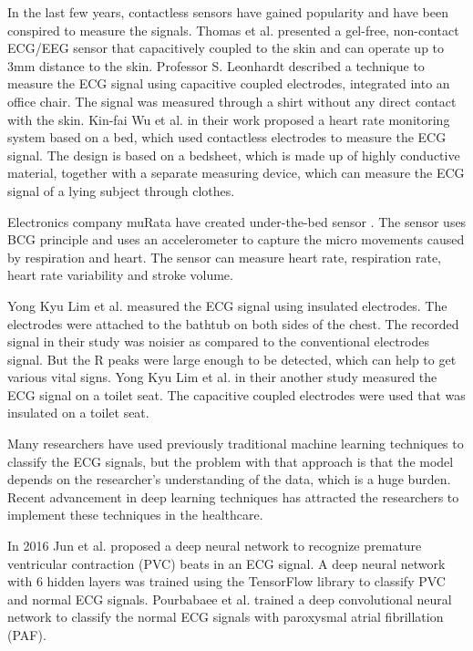 In the last few years, contactless sensors have gained popularity and have been conspired to measure the signals. Thomas et al. \cite{sullivan2007low} presented a gel-free, non-contact ECG/EEG sensor that capacitively coupled to the skin and can operate up to 3mm distance to the skin. Professor S. Leonhardt \cite{aleksandrowicz2007wireless} described a technique to measure the ECG signal using capacitive coupled electrodes, integrated into an office chair. The signal was measured through a shirt without any direct contact with the skin. Kin-fai Wu et al. \cite{wu2008contactless} in their work proposed a heart rate monitoring system based on a bed, which used contactless electrodes to measure the ECG signal. The design is based on a bedsheet, which is made up of highly conductive material, together with a separate measuring device, which can measure the ECG signal of a lying subject through clothes. 

Electronics company muRata have created under-the-bed sensor  \cite{muratabcg bed}. The sensor uses BCG principle and uses an accelerometer to capture the micro movements caused by respiration and heart. The sensor can measure heart rate, respiration rate, heart rate variability and stroke volume.

Yong Kyu Lim et al. \cite{lim2004ecg} measured the ECG signal using insulated electrodes. The electrodes were attached to the bathtub on both sides of the chest. The recorded signal in their study was noisier as compared to the conventional electrodes signal. But the R peaks were large enough to be detected, which can help to get various vital signs. Yong Kyu Lim et al. in their another study \cite{kim2004electrically} measured the ECG signal on a toilet seat. The capacitive coupled electrodes were used that was insulated on a toilet seat.

Many researchers have used previously traditional machine learning techniques to classify the ECG signals, but the problem with that approach is that the model depends on the researcher's understanding of the data, which is a huge burden. Recent advancement in deep learning techniques has attracted the researchers to implement these techniques in the healthcare.

In 2016 Jun et al. \cite{7838258} proposed a deep neural network to recognize premature ventricular contraction (PVC) beats in an ECG signal. A deep neural network with 6 hidden layers was trained using the TensorFlow library to classify PVC and normal ECG signals. Pourbabaee et al. \cite{7727866} trained a deep convolutional neural network to classify the normal ECG signals with paroxysmal atrial fibrillation (PAF).

